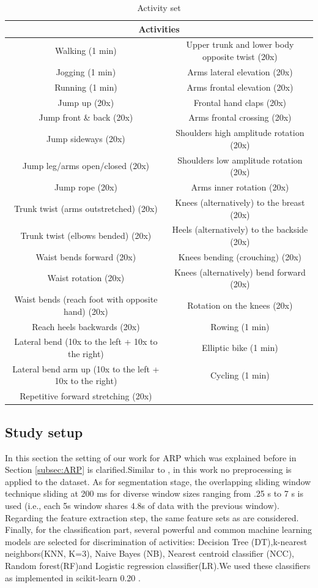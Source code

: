 \begin{table}[h!]
\tiny  
  \centering
\begin{tabular}{|c|c|}
\hline 
\multicolumn{2}{|c|}{Activities}\tabularnewline
\hline 
\hline 
Walking (1 min) & Upper trunk and lower body opposite twist (20x)\tabularnewline
\hline 
Jogging (1 min) & Arms lateral elevation (20x)\tabularnewline
\hline 
Running (1 min) & Arms frontal elevation (20x)\tabularnewline
\hline 
Jump up (20x) & Frontal hand claps (20x)\tabularnewline
\hline 
Jump front \& back (20x) & Arms frontal crossing (20x)\tabularnewline
\hline 
Jump sideways (20x) & Shoulders high amplitude rotation (20x)\tabularnewline
\hline 
Jump leg/arms open/closed (20x) & Shoulders low amplitude rotation (20x)\tabularnewline
\hline 
Jump rope (20x) & Arms inner rotation (20x)\tabularnewline
\hline 
Trunk twist (arms outstretched) (20x) & Knees (alternatively) to the breast (20x)\tabularnewline
\hline 
Trunk twist (elbows bended) (20x) & Heels (alternatively) to the backside (20x)\tabularnewline
\hline 
Waist bends forward (20x) & Knees bending (crouching) (20x)\tabularnewline
\hline 
Waist rotation (20x) & Knees (alternatively) bend forward (20x)\tabularnewline
\hline 
Waist bends (reach foot with opposite hand) (20x) & Rotation on the knees (20x)\tabularnewline
\hline 
Reach heels backwards (20x) & Rowing (1 min)\tabularnewline
\hline 
Lateral bend (10x to the left + 10x to the right) & Elliptic bike (1 min)\tabularnewline
\hline 
Lateral bend arm up (10x to the left + 10x to the right) & Cycling (1 min)\tabularnewline
\hline 
Repetitive forward stretching (20x) & \tabularnewline
\hline 
\end{tabular}

        \caption{Activity set }
        \label{tab:Activites}

\end{table} 


\subsection{Study setup}
In this section the setting of our work for ARP which was explained before in Section \ref{subsec:ARP} is clarified.Similar to \cite{banos2014window}, in this work no preprocessing is applied to the dataset. As for segmentation stage, the overlapping sliding window technique sliding at 200 ms for diverse window sizes ranging from .25 s to 7 s is used (i.e., each 5s window shares 4.8s of data with the previous window). Regarding the feature extraction step, the same feature sets as \cite{banos2014window} are considered. Finally, for the classification part, several powerful and common machine learning models are selected for discrimination of activities: Decision Tree (DT),k-nearest neighbors(KNN, K=3), Naive Bayes (NB), Nearest centroid classifier (NCC), Random forest(RF)and Logistic regression classifier(LR).We used these classifiers as implemented in scikit-learn 0.20 \cite{pedregosa2011scikit}.\newline


